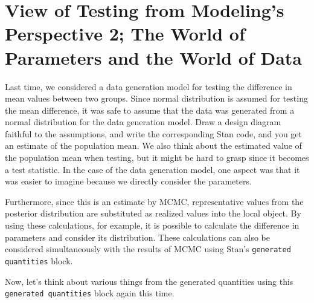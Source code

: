 \documentclass{ltjsbook}
\begin{document}
\chapter{View of Testing from Modeling's Perspective 2; The World of Parameters and the World of Data}
\label{x20_modeling2}
Last time, we considered a data generation model for testing the difference in mean values between two groups. Since normal distribution is assumed for testing the mean difference, it was safe to assume that the data was generated from a normal distribution for the data generation model. Draw a design diagram faithful to the assumptions, and write the corresponding Stan code, and you get an estimate of the population mean. We also think about the estimated value of the population mean when testing, but it might be hard to grasp since it becomes a test statistic. In the case of the data generation model, one aspect was that it was easier to imagine because we directly consider the parameters.

Furthermore, since this is an estimate by MCMC, representative values from the posterior distribution are substituted as realized values into the local object. By using these calculations, for example, it is possible to calculate the difference in parameters and consider its distribution.
These calculations can also be considered simultaneously with the results of MCMC using Stan's \texttt{generated quantities} block.

Now, let's think about various things from the generated quantities using this \texttt{generated quantities} block again this time.
\end{document}
